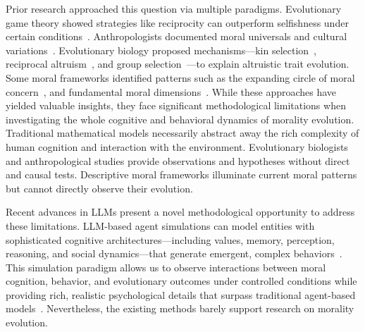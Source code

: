 \documentclass[letterpaper]{article} %
\begin{document}

Prior research approached this question via multiple paradigms. Evolutionary game theory showed strategies like reciprocity can outperform selfishness under certain conditions~\citep{nowak2006five, axelrod1981evolution}. Anthropologists documented moral universals and cultural variations~\citep{henrich2015secret, curry2019good}. Evolutionary biology proposed mechanisms—kin selection~\citep{hamilton1964genetical}, reciprocal altruism~\citep{trivers1971evolution}, and group selection~\citep{wilson2007rethinking}—to explain altruistic trait evolution. Some moral frameworks identified patterns such as the expanding circle of moral concern~\citep{singer1981expanding}, and fundamental moral dimensions~\citep{haidt2007moral}.
While these approaches have yielded valuable insights, they face significant methodological limitations when investigating the whole cognitive and behavioral dynamics of morality evolution. Traditional mathematical models necessarily abstract away the rich complexity of human cognition and interaction with the environment. Evolutionary biologists and anthropological studies provide observations and hypotheses without direct and causal tests. Descriptive moral frameworks illuminate current moral patterns but cannot directly observe their evolution.

Recent advances in LLMs present a novel methodological opportunity to address these limitations. LLM-based agent simulations can model entities with sophisticated cognitive architectures---including values, memory, perception, reasoning, and social dynamics---that generate emergent, complex behaviors~\citep{park2023generative, horton2023large}. This simulation paradigm allows us to observe interactions between moral cognition, behavior, and evolutionary outcomes under controlled conditions while providing rich, realistic psychological details that surpass traditional agent-based models~\citep{aher2023using}.
Nevertheless, the existing methods barely support research on morality evolution.
\end{document}
